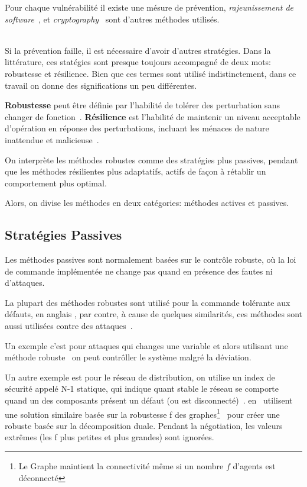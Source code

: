 \documentclass[../main.tex]{subfiles}
\begin{document}
Pour chaque vulnérabilité il existe une mésure de prévention, \emph{rajeunissement de  software}~\cite{AlonsoEtAl2012,GriffioenEtAl2020}, et \emph{cryptography}~\cite{DingEtAl2018} sont d'autres méthodes utilisés.

~\\Si la prévention faille, il est nécessaire d'avoir d'autres stratégies.
Dans la littérature, ces statégies sont presque toujours accompagné de deux mots:
robustesse et résilience.
Bien que ces termes sont utilisé indistinctement, dans ce travail on donne des significations un peu différentes.

\textbf{Robustesse} peut être définie par l'habilité de tolérer des perturbation sans changer de fonction~\cite{Jen2003}.
\textbf{Résilience} est l'habilité de maintenir un niveau acceptable d'opération en réponse des perturbations, incluant les ménaces de nature inattendue et malicieuse~\cite{Rieger2010}.

On interprète les méthodes robustes comme des stratégies plus passives, pendant que les méthodes résilientes plus adaptatifs, actifs de façon à rétablir un comportement plus optimal.

Alors, on divise les méthodes en deux catégories: méthodes actives et passives.

\subsection{Stratégies Passives}\label{sec:protecting_against_attacks_fr}
Les méthodes passives sont normalement basées sur le contrôle robuste, où la loi de commande implémentée ne change pas quand en présence des fautes ni d'attaques.

La plupart des méthodes robustes sont utilisé pour la commande tolérante aux défauts, en anglais \ftc{}, par contre, à cause de quelques similarités, ces méthodes sont aussi utilisées contre des attaques~\cite{TeixeiraEtAl2015,DingEtAl2018,ArauzEtAl2021}.

Un exemple c'est pour attaques \fdi{} qui changes une variable et alors utilisant une méthode robuste~\cite{VahidNaghaviEtAl2014} on peut contrôller le système malgré la déviation.

Un autre exemple est pour le réseau de distribution, on utilise un index de sécurité appelé N-1 statique, qui indique quant stable le réseau se comporte quand un des composants présent un défaut (ou est disconnecté)~\cite{QianEtAl2022}.
\citeauthor{VelardeEtAl2018} en~\cite{VelardeEtAl2018} utilisent une solution similaire basée sur la robustesse f des graphes\footnote{Le Graphe maintient la connectivité même si un nombre $f$ d'agents est déconnecté}~\cite{DibajiIshii2015,WangIshii2019} pour créer une \dmpc{} robuste basée sur la décomposition duale.
Pendant la négotiation, les valeurs extrêmes (les f plus petites et plus grandes) sont ignorées.
\end{document}
